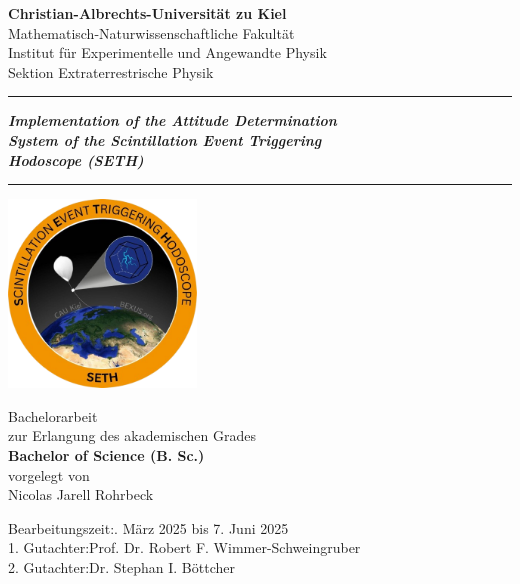 \begin{titlepage}
\Huge\centering

\textbf{Christian-Albrechts-Universität zu Kiel}\\\LARGE\vspace{0.6cm}
Mathematisch-Naturwissenschaftliche Fakultät\\\Large\vspace{0.2cm}
Institut für Experimentelle und Angewandte Physik\\\vspace{0.1cm}
Sektion Extraterrestrische Physik\\\LARGE\vspace{2cm}

\hrule
\textbf{\textit{Implementation of the Attitude Determination\\ System of the Scintillation Event Triggering\\ Hodoscope (SETH)}}
\vspace{0.3cm}
\hrule
\vspace{1cm}

\includegraphics[height=5cm]{images/logo_SETH_v2_nobg.png}

\vspace{0.9cm}

\LARGE
Bachelorarbeit\\\vspace{0.2cm}\Large
zur Erlangung des akademischen Grades\\\vspace{0.2cm}\LARGE
\textbf{Bachelor of Science (B. Sc.)}\\
\large\vspace{1cm}
vorgelegt von\\\vspace{0.2cm}\Large
Nicolas Jarell Rohrbeck

\vspace{1.1cm}
\normalsize
\begin{flushleft}
Bearbeitungszeit:. März 2025 bis 7. Juni 2025\\
1. Gutachter:\quad Prof. Dr. Robert F. Wimmer-Schweingruber\\
2. Gutachter:\quad Dr. Stephan I. Böttcher\\
\end{flushleft}

\end{titlepage}
\restoregeometry